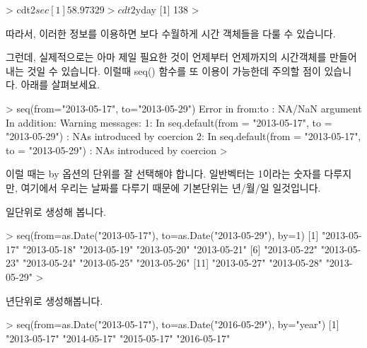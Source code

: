 \documentclass[tutorial.tex]{subfiles}
\begin{document}
\begin{Schunk}
\begin{Soutput} 
> cdt2$sec
[1] 58.97329
> cdt2$yday
[1] 138
> 
\end{Soutput}
\end{Schunk}

따라서, 이러한 정보를 이용하면 보다 수월하게 시간 객체들을 다룰 수 있습니다. 



그런데, 실제적으로는 아마 제일 필요한 것이 언제부터 언제까지의 시간객체를 만들어 내는 것일 수 있습니다. 
이럴때 seq() 함수를 또 이용이 가능한데 주의할 점이 있습니다.
아래를 살펴보세요.


\begin{Schunk}
\begin{Soutput} 
> seq(from="2013-05-17", to="2013-05-29")
Error in from:to : NA/NaN argument
In addition: Warning messages:
1: In seq.default(from = "2013-05-17", to = "2013-05-29") :
  NAs introduced by coercion
2: In seq.default(from = "2013-05-17", to = "2013-05-29") :
  NAs introduced by coercion
>
\end{Soutput}
\end{Schunk}

이럴 때는 by 옵션의 단위를 잘 선택해야 합니다. 
일반벡터는 1이라는 숫자를 다루지만, 여기에서 우리는 날짜를 다루기 때문에 기본단위는 년/월/일 일것입니다.

일단위로 생성해 봅니다. 
\begin{Schunk}
\begin{Soutput} 
> seq(from=as.Date("2013-05-17"), to=as.Date("2013-05-29"), by=1)
 [1] "2013-05-17" "2013-05-18" "2013-05-19" "2013-05-20" "2013-05-21"
 [6] "2013-05-22" "2013-05-23" "2013-05-24" "2013-05-25" "2013-05-26"
[11] "2013-05-27" "2013-05-28" "2013-05-29"
> 
\end{Soutput}
\end{Schunk}


년단위로 생성해봅니다.
\begin{Schunk}
\begin{Soutput} 
> seq(from=as.Date("2013-05-17"), to=as.Date("2016-05-29"), by="year")
[1] "2013-05-17" "2014-05-17" "2015-05-17" "2016-05-17"
\end{Soutput}
\end{Schunk}
\end{document}
